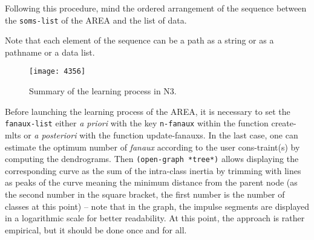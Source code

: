 \bigskip
Following this procedure, mind the ordered arrangement of the sequence between the \texttt{soms-list} of the AREA and the list of data.

Note that each element of the sequence can be a path as a string or as a pathname or a data list.

\bigskip 
\begin{figure}[!ht]
\begin{center}
\texttt{[image: 4356]}
\caption[Summary of the learning process in N3.]{Summary of the learning process in N3\protect\footnotemark.}
\label{fig:resn3}
\end{center}
\end{figure}


\setlength{\textfloatsep}{5pt}

Before launching the learning process of the AREA, it is necessary to set the \texttt{fanaux-list} 
either \textit{a priori} with the key \texttt{n-fanaux} within the function \glspl{create-mlt} or \textit{a posteriori} with the function \glspl{update-fanaux}. In the last case, one can estimate the optimum number of \textit{fanaux} according to the user cons-traint(s) by computing the \glspl{dendrogram}. Then \texttt{(open-graph *tree*)} allows displaying the corresponding curve as the sum of the intra-class inertia by trimming with lines as peaks of the curve meaning the minimum distance from the parent node (as the second number in the square bracket, the first number is the number of classes at this point) -- note that in the graph, the impulse segments are displayed in a logarithmic scale for better readability. At this point, the approach is rather empirical, but it should be done once and for all.

